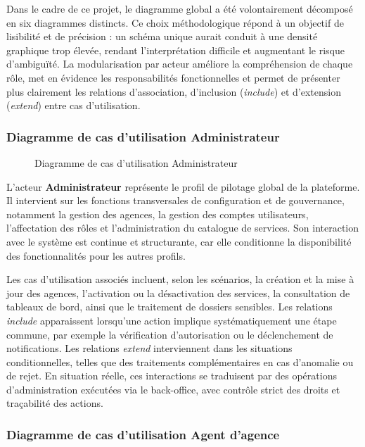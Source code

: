 Dans le cadre de ce projet, le diagramme global a été volontairement décomposé en six diagrammes distincts. Ce choix méthodologique répond à un objectif de lisibilité et de précision : un schéma unique aurait conduit à une densité graphique trop élevée, rendant l'interprétation difficile et augmentant le risque d'ambiguïté. La modularisation par acteur améliore la compréhension de chaque rôle, met en évidence les responsabilités fonctionnelles et permet de présenter plus clairement les relations d'association, d'inclusion (\emph{include}) et d'extension (\emph{extend}) entre cas d'utilisation.

\newpage
\subsubsection{Diagramme de cas d'utilisation Administrateur}

\begin{figure}[H]
  \centering
  
  \caption{Diagramme de cas d'utilisation Administrateur}
  \label{fig:dcu_administrateur}
\end{figure}

L'acteur \textbf{Administrateur} représente le profil de pilotage global de la plateforme. Il intervient sur les fonctions transversales de configuration et de gouvernance, notamment la gestion des agences, la gestion des comptes utilisateurs, l'affectation des rôles et l'administration du catalogue de services. Son interaction avec le système est continue et structurante, car elle conditionne la disponibilité des fonctionnalités pour les autres profils.

Les cas d'utilisation associés incluent, selon les scénarios, la création et la mise à jour des agences, l'activation ou la désactivation des services, la consultation de tableaux de bord, ainsi que le traitement de dossiers sensibles. Les relations \emph{include} apparaissent lorsqu'une action implique systématiquement une étape commune, par exemple la vérification d'autorisation ou le déclenchement de notifications. Les relations \emph{extend} interviennent dans les situations conditionnelles, telles que des traitements complémentaires en cas d'anomalie ou de rejet. En situation réelle, ces interactions se traduisent par des opérations d'administration exécutées via le back-office, avec contrôle strict des droits et traçabilité des actions.

\subsubsection{Diagramme de cas d'utilisation Agent d'agence}

